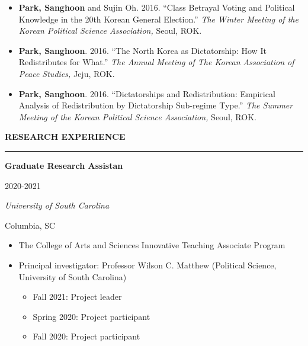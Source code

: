 \documentclass[
  16,
]{article}
\providecommand{\tightlist}{%
  \setlength{\itemsep}{0pt}\setlength{\parskip}{0pt}}\usepackage{longtable,booktabs,array}
\begin{document}
\begin{itemize}
  \item[3.] {\bf Park, Sanghoon} and Sujin Oh. {2016.} {``Class Betrayal Voting and Political Knowledge in the 20th Korean General Election.''} {\it The Winter Meeting of the Korean Political Science Association,} Seoul, ROK.
  \item[2.] {\bf Park, Sanghoon}. {2016.} {``The North Korea as Dictatorship: How It Redistributes for What.''} {\it The Annual Meeting of The Korean Association of Peace Studies,} Jeju, ROK.
  \item[1.] {\bf Park, Sanghoon}. {2016.} {``Dictatorships and Redistribution: Empirical Analysis of Redistribution by Dictatorship Sub-regime Type.''} {\it The Summer Meeting of the Korean Political Science Association,} Seoul, ROK.
\end{itemize}
\vspace{-0.16cm}

\vspace{7pt}

\begin{large}{\bf RESEARCH EXPERIENCE}
  \vspace{3pt}
  \hrule
  \begin{multicols}{2}
    \begin{flushleft}{\bf Graduate Research Assistan}\end{flushleft}
    \begin{flushright}2020-2021\end{flushright}
  \end{multicols}
  \vspace{-0.17cm}
  \begin{multicols}{2}
    \begin{flushleft}\textit{University of South Carolina}\end{flushleft}
    \begin{flushright}Columbia, SC\end{flushright}
  \end{multicols}
  \end{large}
\vspace{-0.16cm}

\begin{itemize}
\tightlist
\item
  The College of Arts and Sciences Innovative Teaching Associate Program
\item
  Principal investigator: Professor Wilson C. Matthew (Political
  Science, University of South Carolina)

  \begin{itemize}
  \tightlist
  \item
    Fall 2021: Project leader
  \item
    Spring 2020: Project participant
  \item
    Fall 2020: Project participant
  \end{itemize}
\end{itemize}
\end{document}
